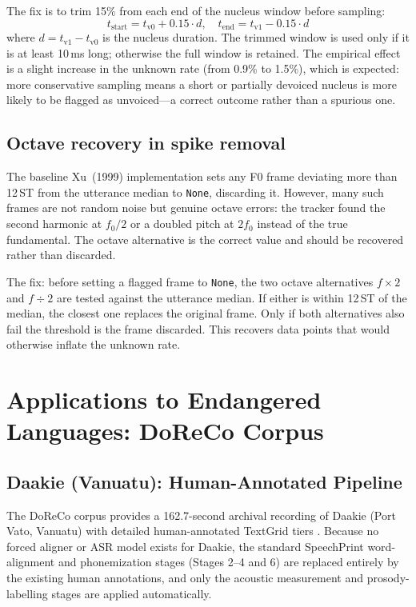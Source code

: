 The fix is to trim 15\% from each end of the nucleus window before sampling:
\begin{equation}
  t_{\mathrm{start}} = t_{\mathrm{v0}} + 0.15 \cdot d, \quad
  t_{\mathrm{end}}   = t_{\mathrm{v1}} - 0.15 \cdot d
\end{equation}
where $d = t_{\mathrm{v1}} - t_{\mathrm{v0}}$ is the nucleus duration. The
trimmed window is used only if it is at least 10\,ms long; otherwise the full
window is retained. The empirical effect is a slight increase in the unknown
rate (from 0.9\% to 1.5\%), which is expected: more conservative sampling means
a short or partially devoiced nucleus is more likely to be flagged as
unvoiced---a correct outcome rather than a spurious one.

\subsection{Octave recovery in spike removal}

The baseline Xu~(1999) implementation sets any F0 frame deviating more than
12\,ST from the utterance median to \texttt{None}, discarding it. However, many
such frames are not random noise but genuine octave errors: the tracker found
the second harmonic at $f_0 / 2$ or a doubled pitch at $2f_0$ instead of the
true fundamental. The octave alternative is the correct value and should be
recovered rather than discarded.

The fix: before setting a flagged frame to \texttt{None}, the two octave
alternatives $f \times 2$ and $f \div 2$ are tested against the utterance
median. If either is within 12\,ST of the median, the closest one replaces the
original frame. Only if both alternatives also fail the threshold is the frame
discarded. This recovers data points that would otherwise inflate the unknown
rate.

\section{Applications to Endangered Languages: DoReCo Corpus}
\label{sec:doreco_pipeline}

\subsection{Daakie (Vanuatu): Human-Annotated Pipeline}

The DoReCo corpus provides a 162.7-second archival recording of Daakie (Port
Vato, Vanuatu) with detailed human-annotated TextGrid tiers
\cite{seifart2022doreco,krifka2024daakie}.
Because no forced aligner or ASR model exists for Daakie, the standard
SpeechPrint word-alignment and phonemization stages (Stages 2--4 and 6) are
replaced entirely by the existing human annotations, and only the acoustic
measurement and prosody-labelling stages are applied automatically.

